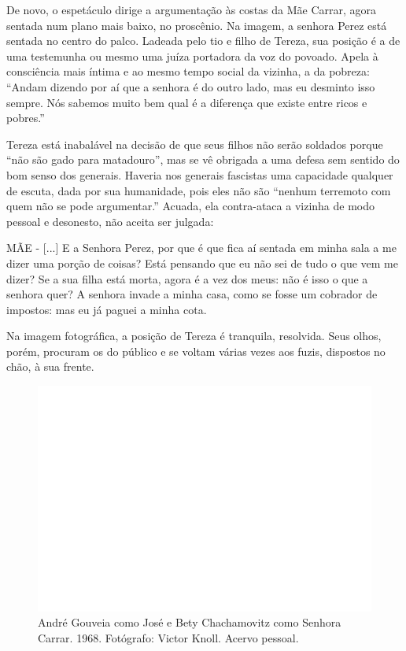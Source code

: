 De novo, o espetáculo dirige a argumentação às costas da Mãe Carrar,
agora sentada num plano mais baixo, no proscênio. Na imagem, a senhora
Perez está sentada no centro do palco. Ladeada pelo tio e filho de
Tereza, sua posição é a de uma testemunha ou mesmo uma juíza portadora
da voz do povoado. Apela à consciência mais íntima e ao mesmo tempo
social da vizinha, a da pobreza: “Andam dizendo por aí que a senhora é
do outro lado, mas eu desminto isso sempre. Nós sabemos muito bem qual é
a diferença que existe entre ricos e pobres.”

Tereza está inabalável na decisão de que seus filhos não serão soldados
porque “não são gado para matadouro”, mas se vê obrigada a uma defesa
sem sentido do bom senso dos generais. Haveria nos generais fascistas
uma capacidade qualquer de escuta, dada por sua humanidade, pois eles
não são “nenhum terremoto com quem não se pode argumentar.” Acuada, ela
contra-ataca a vizinha de modo pessoal e desonesto, não aceita ser
julgada:

MÃE - {[}...{]} E a Senhora Perez, por que é que fica aí sentada em
minha sala a me dizer uma porção de coisas? Está pensando que eu não sei
de tudo o que vem me dizer? Se a sua filha está morta, agora é a vez dos
meus: não é isso o que a senhora quer? A senhora invade a minha casa,
como se fosse um cobrador de impostos: mas eu já paguei a minha cota.

Na imagem fotográfica, a posição de Tereza é tranquila, resolvida. Seus
olhos, porém, procuram os do público e se voltam várias vezes aos fuzis,
dispostos no chão, à sua frente.

\begin{figure}
\includegraphics[width=\columnwidth]{./media/IMAGEM50.png}
\caption{André Gouveia como José e Bety Chachamovitz como Senhora Carrar. 1968.
Fotógrafo: Victor Knoll. Acervo pessoal.}
\end{figure}

